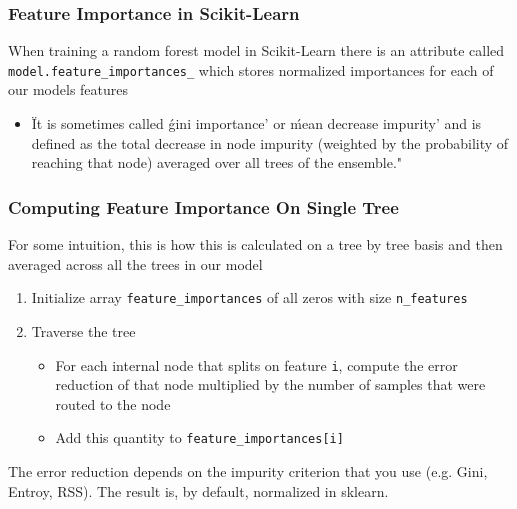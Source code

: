 \documentclass[table,dvipsnames]{beamer}
\begin{document}

\begin{frame}
\frametitle{Feature Importance in Scikit-Learn}
When training a random forest model in Scikit-Learn there is an attribute called \texttt{model.feature_importances_} which stores normalized importances for each of our models features

\begin{itemize}
    \item \"It is sometimes called \'gini importance' or \'mean decrease impurity' and is defined as the total decrease in node impurity (weighted by the probability of reaching that node) averaged over all trees of the ensemble."
\end{itemize}
\end{frame}


\begin{frame}
\frametitle{Computing Feature Importance On Single Tree}
For some intuition, this is how this is calculated on a tree by tree basis and then averaged across all the trees in our model

\begin{enumerate}
    \item Initialize array \texttt{feature_importances} of all zeros with size \texttt{n_features}
    \item Traverse the tree
    \begin{itemize}
        \item For each internal node that splits on feature \texttt{i}, compute the error reduction of that node multiplied by the number of samples that were routed to the node
        \item Add this quantity to \texttt{feature_importances[i]}
    \end{itemize}
\end{enumerate}

The error reduction depends on the impurity criterion that you use (e.g. Gini, Entroy, RSS).  The result is, by default, normalized in sklearn.

\end{frame}

\end{document}
